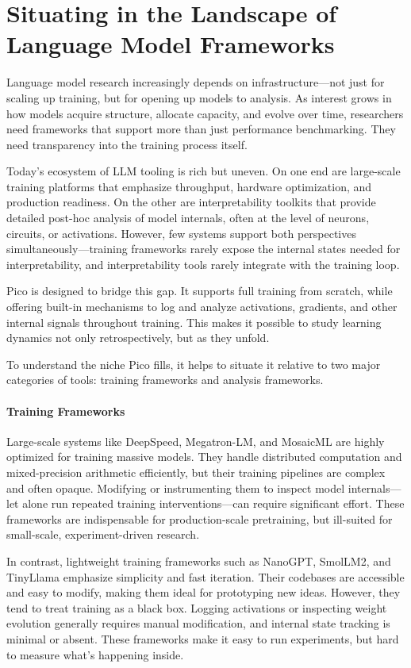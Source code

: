 \section{Situating \picolarge in the Landscape of Language Model Frameworks}
\label{sec:pico-related}

Language model research increasingly depends on infrastructure—not just for scaling up training, but for opening up models to analysis. As interest grows in how models acquire structure, allocate capacity, and evolve over time, researchers need frameworks that support more than just performance benchmarking. They need transparency into the training process itself.

Today's ecosystem of LLM tooling is rich but uneven. On one end are large-scale training platforms that emphasize throughput, hardware optimization, and production readiness. On the other are interpretability toolkits that provide detailed post-hoc analysis of model internals, often at the level of neurons, circuits, or activations. However, few systems support both perspectives simultaneously—training frameworks rarely expose the internal states needed for interpretability, and interpretability tools rarely integrate with the training loop.

Pico is designed to bridge this gap. It supports full training from scratch, while offering built-in mechanisms to log and analyze activations, gradients, and other internal signals throughout training. This makes it possible to study learning dynamics not only retrospectively, but as they unfold.

To understand the niche Pico fills, it helps to situate it relative to two major categories of tools: training frameworks and analysis frameworks.

\paragraph{Training Frameworks} Large-scale systems like DeepSpeed, Megatron-LM, and MosaicML are highly optimized for training massive models. They handle distributed computation and mixed-precision arithmetic efficiently, but their training pipelines are complex and often opaque. Modifying or instrumenting them to inspect model internals—let alone run repeated training interventions—can require significant effort. These frameworks are indispensable for production-scale pretraining, but ill-suited for small-scale, experiment-driven research.

In contrast, lightweight training frameworks such as NanoGPT, SmolLM2, and TinyLlama emphasize simplicity and fast iteration. Their codebases are accessible and easy to modify, making them ideal for prototyping new ideas. However, they tend to treat training as a black box. Logging activations or inspecting weight evolution generally requires manual modification, and internal state tracking is minimal or absent. These frameworks make it easy to run experiments, but hard to measure what's happening inside.

